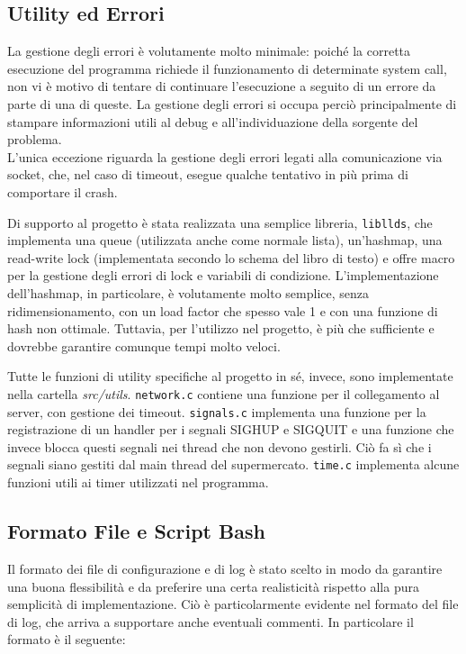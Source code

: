 \documentclass[a4paper,11pt] {article}
\begin{document}
\subsection*{Utility ed Errori}

La gestione degli errori è volutamente molto minimale: poiché la corretta esecuzione del programma richiede il funzionamento di determinate system call, non vi è motivo di tentare di continuare l'esecuzione a seguito di un errore da parte di una di queste. La gestione degli errori si occupa perciò principalmente di stampare informazioni utili al debug e all'individuazione della sorgente del problema.\\
L'unica eccezione riguarda la gestione degli errori legati alla comunicazione via socket, che, nel caso di timeout, esegue qualche tentativo in più prima di comportare il crash.

Di supporto al progetto è stata realizzata una semplice libreria, \lstinline{libllds}, che implementa una queue (utilizzata anche come normale lista), un'hashmap, una read-write lock (implementata secondo lo schema del libro di testo) e offre macro per la gestione degli errori di lock e variabili di condizione. L'implementazione dell'hashmap, in particolare, è volutamente molto semplice, senza ridimensionamento, con un load factor che spesso vale 1 e con una funzione di hash non ottimale. Tuttavia, per l'utilizzo nel progetto, è più che sufficiente e dovrebbe garantire comunque tempi molto veloci.

Tutte le funzioni di utility specifiche al progetto in sé, invece, sono implementate nella cartella \textit{src/utils}. \lstinline{network.c} contiene una funzione per il collegamento al server, con gestione dei timeout. \lstinline{signals.c} implementa una funzione per la registrazione di un handler per i segnali SIGHUP e SIGQUIT e una funzione che invece blocca questi segnali nei thread che non devono gestirli. Ciò fa sì che i segnali siano gestiti dal main thread del supermercato. \lstinline{time.c} implementa alcune funzioni utili ai timer utilizzati nel programma.

\subsection*{Formato File e Script Bash}

Il formato dei file di configurazione e di log è stato scelto in modo da garantire una buona flessibilità e da preferire una certa realisticità rispetto alla pura semplicità di implementazione. Ciò è particolarmente evidente nel formato del file di log, che arriva a supportare anche eventuali commenti. In particolare il formato è il seguente:
\end{document}
